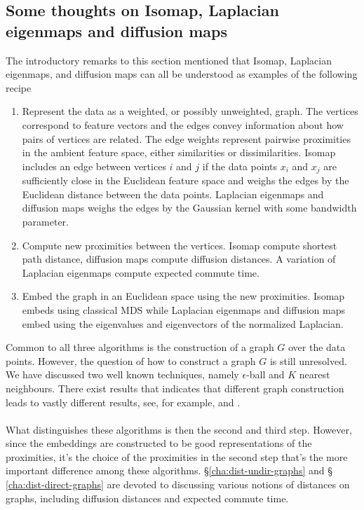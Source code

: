 \subsection{Some thoughts on Isomap, Laplacian eigenmaps and diffusion maps}
\label{sec:some-thoughts-isomap}
The introductory remarks to this section mentioned that Isomap,
Laplacian eigenmaps, and diffusion maps can all be understood as
examples of the following recipe
\begin{enumerate}
\item Represent the data as a weighted, or possibly unweighted,
  graph. The vertices correspond to feature vectors and the edges
  convey information about how pairs of vertices are related. The edge
  weights represent pairwise proximities in the ambient feature space,
  either similarities or dissimilarities. Isomap includes an edge
  between vertices $i$ and $j$ if the data points $x_i$ and $x_j$ are
  sufficiently close in the Euclidean feature space and weighs the
  edges by the Euclidean distance between the data points. Laplacian
  eigenmaps and diffusion maps weighs the edges by the Gaussian
  kernel with some bandwidth parameter.
\item Compute new proximities between the vertices. Isomap compute
  shortest path distance, diffusion maps compute diffusion
  distances. A variation of Laplacian eigenmaps compute expected
  commute time.
\item Embed the graph in an Euclidean space using the new
  proximities. Isomap embeds using classical MDS while Laplacian
  eigenmaps and diffusion maps embed using the eigenvalues and
  eigenvectors of the normalized Laplacian. 
\end{enumerate}
Common to all three algorithms is the construction of a graph $G$ over
the data points. However, the question of how to construct a graph $G$
is still unresolved. We have discussed two well known techniques,
namely $\epsilon$-ball and $K$ nearest neighbours. There exist results
that indicates that different graph construction leads to vastly
different results, see, for example,
\citet{maier08:_influen} and \citet{maier09:_optim_k}. \\ \\
%
%
\noindent
What distinguishes these algorithms is then the second and third
step. However, since the embeddings are constructed to be good
representations of the proximities, it's the choice of the proximities
in the second step that's the more important difference among these
algorithms. \S \ref{cha:dist-undir-graphs} and \S
\ref{cha:dist-direct-graphs} are devoted to discussing various notions
of distances on graphs, including diffusion distances and expected
commute time.
%
%

